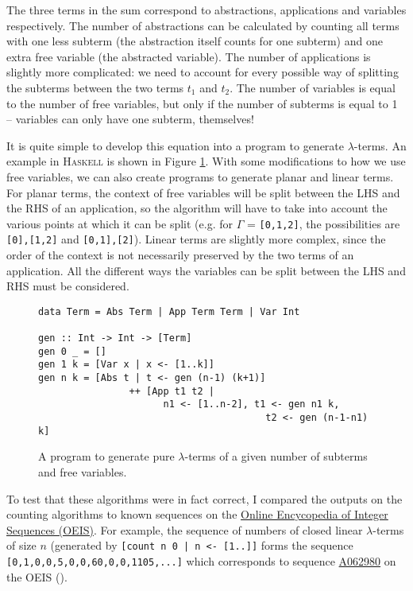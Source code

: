 \documentclass[11pt]{article}
\begin{document}
The three terms in the sum correspond to abstractions, applications and variables respectively. The number of abstractions can be calculated by counting all terms with one less subterm (the abstraction itself counts for one subterm) and one extra free variable (the abstracted variable). The number of applications is slightly more complicated: we need to account for every possible way of splitting the subterms between the two terms $t_1$ and $t_2$. The number of variables is equal to the number of free variables, but only if the number of subterms is equal to 1 -- variables can only have one subterm, themselves!

It is quite simple to develop this equation into a program to generate $\lambda$-terms. An example in \textsc{Haskell} is shown in Figure \ref{fig:gen}. With some modifications to how we use free variables, we can also create programs to generate planar and linear terms. For planar terms, the context of free variables will be split between the LHS and the RHS of an application, so the algorithm will have to take into account the various points at which it can be split (e.g. for $\Gamma$ = \texttt{[0,1,2]}, the possibilities are \texttt{[0],[1,2]} and \texttt{[0,1],[2]}). Linear terms are slightly more complex, since the order of the context is not necessarily preserved by the two terms of an application. All the different ways the variables can be split between the LHS and RHS must be considered.

\begin{figure}
\begin{verbatim}
data Term = Abs Term | App Term Term | Var Int

gen :: Int -> Int -> [Term]
gen 0 _ = []
gen 1 k = [Var x | x <- [1..k]]
gen n k = [Abs t | t <- gen (n-1) (k+1)]
                ++ [App t1 t2 | 
                      n1 <- [1..n-2], t1 <- gen n1 k, 
                                        t2 <- gen (n-1-n1) k] 
\end{verbatim}
\caption{A program to generate pure $\lambda$-terms of a given number of subterms and free variables.}
\label{fig:gen}
\end{figure}

To test that these algorithms were in fact correct, I compared the outputs on the counting algorithms to known sequences on the \href{https://oeis.org}{Online Encycopedia of Integer Sequences (OEIS)}. For example, the sequence of numbers of closed linear $\lambda$-terms of size $n$ (generated by \texttt{[count n 0 | n <- [1..]]} forms the sequence \texttt{[0,1,0,0,5,0,0,60,0,0,1105,...]} which corresponds to sequence \href{https://oeis.org/A062980}{A062980} on the OEIS (\cite{zeiljfp}).
\end{document}
